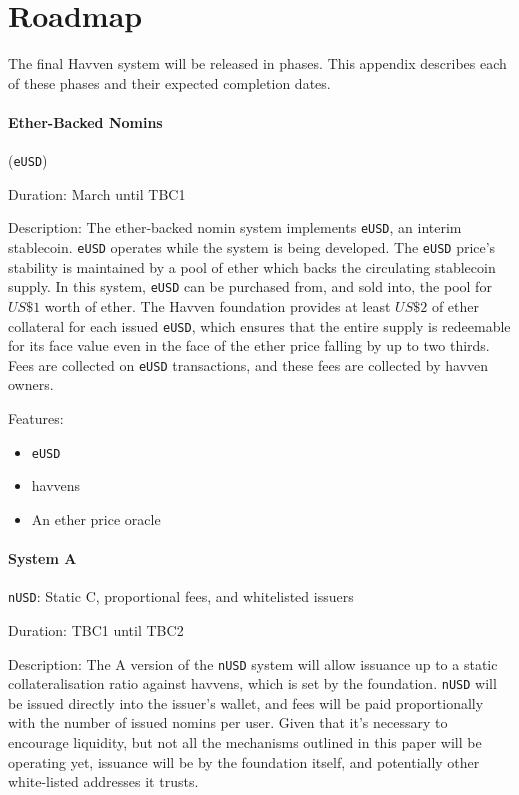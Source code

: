 \section{Roadmap}

The final Havven system will be released in phases. This appendix describes
each of these phases and their expected completion dates.

\paragraph{Ether-Backed Nomins} (\texttt{eUSD})

Duration: March until TBC1

Description:
The ether-backed nomin system implements \texttt{eUSD}, an interim stablecoin.
\texttt{eUSD} operates while the system is being developed.
The \texttt{eUSD} price's stability is maintained by a pool of ether which
backs the circulating stablecoin supply. In this system, \texttt{eUSD} can be
purchased from, and sold into, the pool for \(US\$1\) worth of ether.
The Havven foundation provides at least \(US\$2\) of ether collateral for each
issued \texttt{eUSD}, which ensures that the entire supply is redeemable for its
face value even in the face of the ether price falling by up to two thirds.
Fees are collected on \texttt{eUSD} transactions, and these fees are collected
by havven owners.

Features:
\begin{itemize}
    \item{\texttt{eUSD}}
    \item{havvens}
    \item{An ether price oracle}
\end{itemize}


\paragraph{System A} \texttt{nUSD}: Static C, proportional fees, and whitelisted issuers 

Duration: TBC1 until TBC2

Description:
The A version of the \texttt{nUSD} system will allow issuance up to a static
collateralisation ratio against havvens, which is set by the foundation.
\texttt{nUSD} will be issued directly into the issuer's wallet, and fees will be paid
proportionally with the number of issued nomins per user. Given that it's necessary to
encourage liquidity, but not all the mechanisms outlined in this paper will be operating
yet, issuance will be by the foundation itself, and potentially other white-listed
addresses it trusts.

